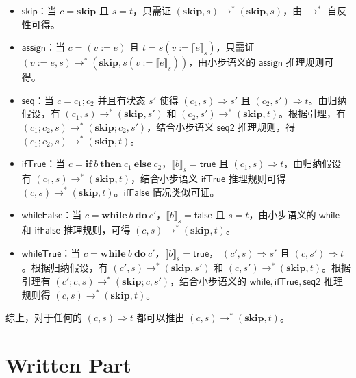 \documentclass[UTF8]{ctexart}
\begin{document}
\begin{framed}
        \begin{itemize}
            \item $\mathsf{skip}$：当 $c=\mathbf{skip}$ 且 $s=t$，只需证 $(\mathbf{skip}, s) \to^{\ast} (\mathbf{skip}, s)$，由 $\to^{\ast}$ 自反性可得。
            \item $\mathsf{assign}$：当 $c=(v:=e)$ 且 $t=s(v:={\llbracket e \rrbracket}_s)$，只需证 $(v:=e,s) \to^{\ast} (\mathbf{skip}, s(v:={\llbracket e \rrbracket}_s))$，由小步语义的 $\mathsf{assign}$ 推理规则可得。
            \item $\mathsf{seq}$：当 $c=c_1; c_2$ 并且有状态 $s'$ 使得 $(c_1, s)\Rightarrow s'$ 且 $(c_2, s') \Rightarrow t$。由归纳假设，有 $(c_1, s) \to^{\ast} (\mathbf{skip}, s')$ 和 $(c_2, s') \to^{\ast} (\mathbf{skip}, t)$。根据引理，有 $(c_1; c_2, s) \to^{\ast} (\mathbf{skip}; c_2, s')$，结合小步语义 $\mathsf{seq2}$ 推理规则，得 $(c_1; c_2, s) \to^{\ast} (\mathbf{skip}, t)$。
            \item $\mathsf{ifTrue}$：当 $c=\mathbf{if}\ b\ \mathbf{then}\ c_1\ \mathbf{else}\ c_2$，${\llbracket b \rrbracket}_s=\mathsf{true}$ 且 $(c_1, s) \Rightarrow t$，由归纳假设有 $(c_1, s) \to^{\ast} (\mathbf{skip}, t)$，结合小步语义 $\mathsf{ifTrue}$ 推理规则可得 $(c, s) \to^{\ast} (\mathbf{skip}, t)$。$\mathsf{ifFalse}$ 情况类似可证。
            \item $\mathsf{whileFalse}$：当 $c=\mathbf{while}\ b\ \mathbf{do}\ c'$，${\llbracket b \rrbracket}_s=\mathsf{false}$ 且 $s=t$，由小步语义的 $\mathsf{while}$ 和 $\mathsf{ifFalse}$ 推理规则，可得 $(c, s) \to^{\ast} (\mathbf{skip}, t)$。
            \item $\mathsf{whileTrue}$：当 $c=\mathbf{while}\ b\ \mathbf{do}\ c'$，${\llbracket b \rrbracket}_s=\mathsf{true}$， $(c', s) \Rightarrow s'$ 且 $(c, s') \Rightarrow t$。根据归纳假设，有 $(c', s) \to^{\ast} (\mathbf{skip}, s')$ 和 $(c, s') \to^{\ast} (\mathbf{skip}, t)$。根据引理有 $(c';c, s) \to^{\ast} (\mathbf{skip};c, s')$，结合小步语义的 $\mathsf{while},\mathsf{ifTrue},\mathsf{seq2}$ 推理规则得 $(c, s) \to^{\ast} (\mathbf{skip}, t)$。
        \end{itemize}
        综上，对于任何的 $(c, s) \Rightarrow t$ 都可以推出 $(c, s) \to^{\ast} (\mathbf{skip}, t)$。
    \end{framed}

    \newpage
    
    \section*{Written Part}
\end{document}
